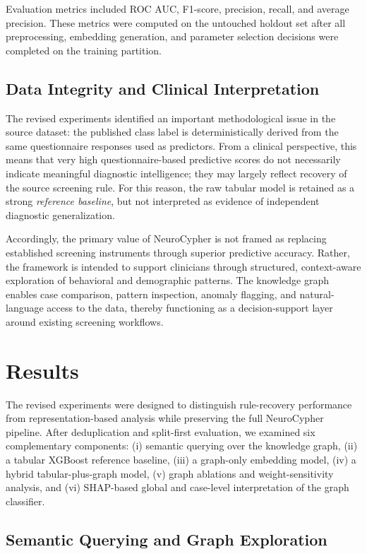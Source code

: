 \documentclass[pdflatex,sn-basic]{sn-jnl}%
\theoremstyle{thmstyleone}%
\theoremstyle{thmstyletwo}%
\theoremstyle{thmstylethree}%
\begin{document}
Evaluation metrics included ROC AUC, F1-score, precision, recall, and average precision. These metrics were computed on the untouched holdout set after all preprocessing, embedding generation, and parameter selection decisions were completed on the training partition.

\subsection{Data Integrity and Clinical Interpretation}

The revised experiments identified an important methodological issue in the source dataset: the published class label is deterministically derived from the same questionnaire responses used as predictors. From a clinical perspective, this means that very high questionnaire-based predictive scores do not necessarily indicate meaningful diagnostic intelligence; they may largely reflect recovery of the source screening rule. For this reason, the raw tabular model is retained as a strong \textit{reference baseline}, but not interpreted as evidence of independent diagnostic generalization.

Accordingly, the primary value of NeuroCypher is not framed as replacing established screening instruments through superior predictive accuracy. Rather, the framework is intended to support clinicians through structured, context-aware exploration of behavioral and demographic patterns. The knowledge graph enables case comparison, pattern inspection, anomaly flagging, and natural-language access to the data, thereby functioning as a decision-support layer around existing screening workflows.

\section{Results}\label{sec2}

The revised experiments were designed to distinguish rule-recovery performance from representation-based analysis while preserving the full NeuroCypher pipeline. After deduplication and split-first evaluation, we examined six complementary components: (i) semantic querying over the knowledge graph, (ii) a tabular XGBoost reference baseline, (iii) a graph-only embedding model, (iv) a hybrid tabular-plus-graph model, (v) graph ablations and weight-sensitivity analysis, and (vi) SHAP-based global and case-level interpretation of the graph classifier.

\subsection{Semantic Querying and Graph Exploration}
\end{document}

